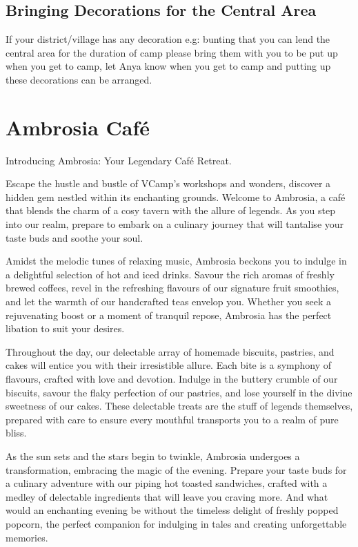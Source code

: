 \documentclass[a4paper, 11pt]{report}
\begin{document}
\section{Bringing Decorations for the Central Area}
If your district/village has any decoration e.g: bunting that you can lend the central area for the duration of camp please bring them with you to be put up when you get to camp, let Anya know when you get to camp and putting up these decorations can be arranged. 

\chapter{Ambrosia Café}
Introducing Ambrosia: Your Legendary Café Retreat.\nl

Escape the hustle and bustle of VCamp's workshops and wonders, discover a hidden gem nestled within its enchanting grounds. Welcome to Ambrosia, a café that blends the charm of a cosy tavern with the allure of legends. As you step into our realm, prepare to embark on a culinary journey that will tantalise your taste buds and soothe your soul.\nl

Amidst the melodic tunes of relaxing music, Ambrosia beckons you to indulge in a delightful selection of hot and iced drinks. Savour the rich aromas of freshly brewed coffees, revel in the refreshing flavours of our signature fruit smoothies, and let the warmth of our handcrafted teas envelop you. Whether you seek a rejuvenating boost or a moment of tranquil repose, Ambrosia has the perfect libation to suit your desires.\nl

Throughout the day, our delectable array of homemade biscuits, pastries, and cakes will entice you with their irresistible allure. Each bite is a symphony of flavours, crafted with love and devotion. Indulge in the buttery crumble of our biscuits, savour the flaky perfection of our pastries, and lose yourself in the divine sweetness of our cakes. These delectable treats are the stuff of legends themselves, prepared with care to ensure every mouthful transports you to a realm of pure bliss.\nl

As the sun sets and the stars begin to twinkle, Ambrosia undergoes a transformation, embracing the magic of the evening. Prepare your taste buds for a culinary adventure with our piping hot toasted sandwiches, crafted with a medley of delectable ingredients that will leave you craving more. And what would an enchanting evening be without the timeless delight of freshly popped popcorn, the perfect companion for indulging in tales and creating unforgettable memories.\nl
\end{document}
